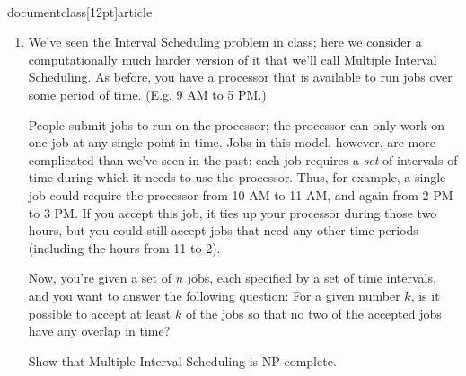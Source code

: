 \\documentclass[12pt]{article}
\begin{document}
\begin{enumerate}

\item 

We've seen the
Interval Scheduling problem in class;
here we consider a computationally much harder version of it that we'll call
{\sc Multiple Interval Scheduling}.
As before, you have a processor that is available to
run jobs over some period of time.
(E.g. 9 AM to 5 PM.)

People submit jobs to run on the processor;
the processor can only work on one job at any single point in time.
Jobs in this model, however, are more complicated than we've seen in the past:
each job requires a {\em set} of intervals of time
during which it needs to use the processor.
Thus, for example, a single job could require
the processor from 10 AM to 11 AM, and again from 2 PM to 3 PM.
If you accept this job, it ties up your processor during
those two hours, but you could still accept jobs that
need any other time periods (including the hours from 11 to 2).

Now, you're given a set of $n$ jobs, each specified by
a set of time intervals, and you want to
answer the following question:
For a given number $k$, is it possible to accept
at least $k$ of the jobs so that no two of the accepted
jobs have any overlap in time?

Show that {\sc Multiple Interval Scheduling}
is NP-complete.

\end{enumerate}
\end{document}
